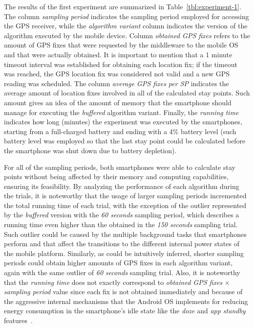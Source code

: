 \documentclass[ENG,PhD]{cinvestav}
\begin{document}
The results of the first experiment are summarized in Table~\ref{tbl:experiment-1}.
The column \emph{sampling period} indicates the sampling period employed for accessing the GPS receiver, while the \emph{algorithm variant} column indicates the version of the algorithm executed by the mobile device.
Column \emph{obtained GPS fixes} refers to the amount of GPS fixes that were requested by the middleware to the mobile OS and that were actually obtained.
It is important to mention that a 1 minute timeout interval was established for obtaining each location fix; if the timeout was reached, the GPS location fix was considered not valid and a new GPS reading was scheduled.
The column \emph{average GPS fixes per SP} indicates the average amount of location fixes involved in all of the calculated stay points.
Such amount gives an idea of the amount of memory that the smartphone should manage for executing the \emph{buffered} algorithm variant.
Finally, the \emph{running time} indicates how long (minutes) the experiment was executed by the smartphones, starting from a full-charged battery and ending with a 4\% battery level (such battery level was employed so that the last stay point could be calculated before the smartphone was shut down due to battery depletion).

For all of the sampling periods, both smartphones were able to calculate stay points without being affected by their memory and computing capabilities, ensuring its feasibility.
By analyzing the performance of each algorithm during the trials, it is noteworthy that the usage of larger sampling periods incremented the total running time of each trial, with the exception of the outlier represented by the \emph{buffered} version with the \emph{60 seconds} sampling period, which describes a running time even higher than the obtained in the \emph{150 seconds} sampling trial.
Such outlier could be caused by the multiple background tasks that smartphones perform and that affect the transitions to the different internal power states of the mobile platform.
Similarly, as could be intuitively inferred, shorter sampling periods could obtain higher amounts of GPS fixes in each algorithm variant, again with the same outlier of \emph{60 seconds} sampling trial.
Also, it is noteworthy that the \emph{running time} does not exactly correspond to \emph{obtained GPS fixes} $\times$ \emph{sampling period} value since each fix is not obtained immediately and because of the aggressive internal mechanisms that the Android OS implements for reducing energy consumption in the smartphone's idle state like the \emph{doze} and \emph{app standby} features~\cite{Android2016b}.
\end{document}
